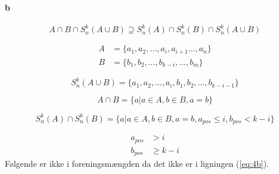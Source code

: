 \paragraph{b}

\begin{equation}\label{eq:4b}
    A \cap B \cap S^{k}_{n}(A \cup B) \supseteq S^{k}_{n}(A) \cap S^{k}_{n}(B) \cap S^{k}_{n}(A \cup B)
\end{equation}

\begin{align*}
    A &=\{a_1, a_2, \dots , a_{i}, a_{i+1} \dots  , a_n\}\\
    B &=\{b_1, b_2, \dots , b_{k-i}, \dots , b_m\}
\end{align*}

\begin{equation*}
    S^{k}_{n}(A\cup B) =\{a_1, a_2, \dots , a_{i}, b_1, b_2, \dots , b_{k-i-1}\}
\end{equation*}

\begin{equation*}
    A \cap B = \{ a | a \in A, b \in B, a = b\}
\end{equation*}

\begin{equation*}
    S^{k}_{n}(A) \cap S^{k}_{n}(B) = \{a | a \in A, b \in B, a = b, a_{pos} \le i, b_{pos} < k-i\}
\end{equation*}

\begin{align*}
    a_{pos} & > i \\
    b_{pos} & \ge k-i
\end{align*}
F\o lgende er ikke i foreningsmængden da det ikke er i ligningen (\ref{eq:4b}).
